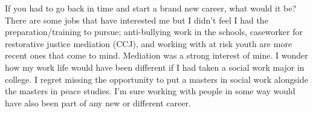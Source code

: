 If you had to go back in time and start a brand new career, what would it be?
There are some jobs that have interested me but I didn't feel I had the preparation/training to pursue; anti-bullying work in the schools, caseworker for restorative justice mediation (CCJ), and working with at risk youth are more recent ones that come to mind.
Mediation was a strong interest of mine.
I wonder how my work life would have been different if I had taken a social work major in college.
I regret missing the opportunity to put a masters in social work alongside the masters in peace studies.
I'm sure working with people in some way would have also been part of any new or different career.






